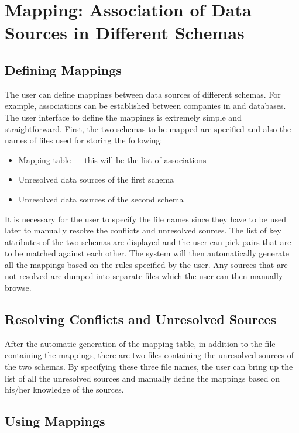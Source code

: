 \section{Mapping: Association of Data Sources in Different Schemas}

\subsection{Defining Mappings}

The user can define mappings between data sources of different
schemas.  For example, associations can be established between
companies in  and  databases. The user
interface to define the mappings is extremely simple and
straightforward. First, the two schemas to be mapped are specified and
also the names of files used for storing the following:

\begin{itemize}
\item Mapping table --- this will be the list of associations
\item Unresolved data sources of the first schema 
\item Unresolved data sources of the second schema
\end{itemize}

It is necessary for the user to specify the file names since they have
to be used later to manually resolve the conflicts and unresolved
sources. The list of key attributes of the two schemas are displayed
and the user can pick pairs that are to be matched against each other.
The system will then automatically generate all the mappings based on
the rules specified by the user.  Any sources that are not resolved
are dumped into separate files which the user can then manually
browse.

\subsection{Resolving Conflicts and Unresolved Sources}

After the automatic generation of the mapping table, in addition to
the file containing the mappings, there are two files containing the
unresolved sources of the two schemas. By specifying these three file
names, the user can bring up the list of all the unresolved sources
and manually define the mappings based on his/her knowledge of the
sources.

\subsection{Using Mappings}

